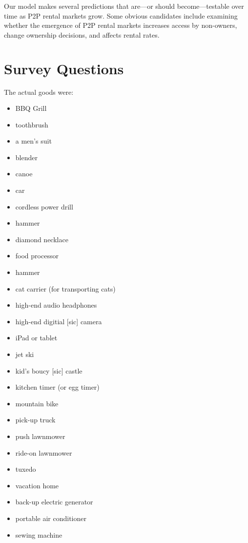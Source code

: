 \documentclass[11pt]{article}
\begin{document}
Our model makes several predictions that are---or should become---testable over time as P2P rental markets grow.
Some obvious candidates include examining whether the emergence of P2P rental markets increases access by non-owners, change ownership decisions, and affects rental rates.





\newpage 

\appendix 

\section{Survey Questions \label{sec:survey}} 

The actual goods were: 

\begin{itemize} 
\item BBQ Grill
\item toothbrush
\item a men's suit
\item blender
\item canoe
\item car
\item cordless power drill
\item hammer
\item diamond necklace
\item food processor
\item hammer
\item cat carrier (for transporting cats)
\item high-end audio headphones
\item high-end digitial [sic] camera
\item iPad or tablet
\item jet ski
\item kid's boucy [sic] castle
\item kitchen timer (or egg timer)
\item mountain bike
\item pick-up truck
\item push lawnmower
\item ride-on lawnmower
\item tuxedo
 \item vacation home
\item back-up electric generator
\item portable air conditioner
\item sewing machine
\end{itemize} 
\end{document}
